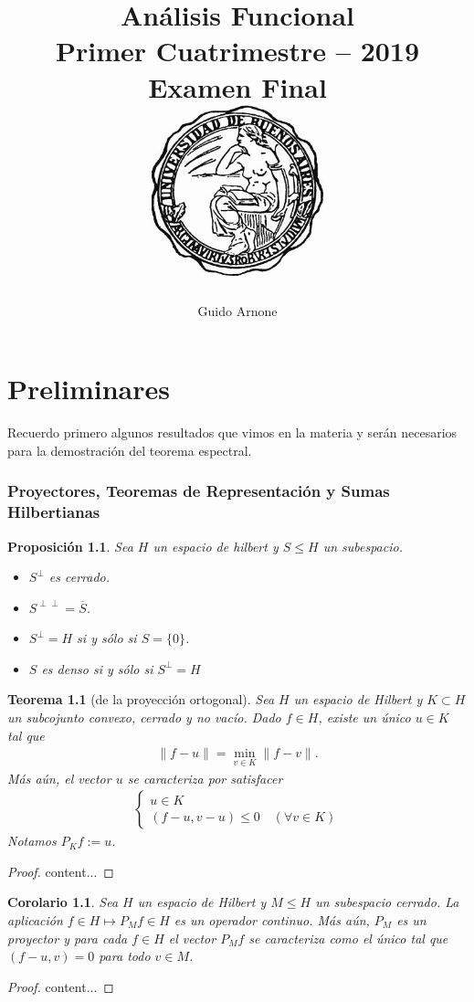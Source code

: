\documentclass[11pt]{report}
\title{
\LARGE{Análisis Funcional}
\\
\vspace{1pt}
\small{Primer Cuatrimestre -- 2019}
\\
\vspace{0.5pt}
\large{Examen Final}
\\
\vspace{80pt}
{\includegraphics[height=5cm]{uba2.jpg}}
\vspace{80pt}
}
\author{Guido Arnone}
\date{}
\theoremstyle{colored}
\newtheorem{theorem}{Teorema}[section]
\newtheorem{proposition}{Proposición}[section]
\newtheorem{corollary}{Corolario}[section]
\newcommand{\ip}[1]{( #1 )}
\begin{document}
\maketitle
\tableofcontents

\chapter{Preliminares}
Recuerdo primero algunos resultados que vimos en la materia y serán necesarios para la demostración del teorema espectral.
\subsection{Proyectores, Teoremas de Representación y Sumas Hilbertianas}

\begin{proposition} Sea $H$ un espacio de hilbert y $S \leq H$ un subespacio. 
\begin{itemize}
\item[(i)] $S^\perp$ es cerrado.
\item[(i)] $S^{\perp\perp} = \overline{S}$.
\item[(iii)] $S^\perp = H$ si y sólo si $S = \{0\}$.
\item[(iv)] $S$ es denso si y sólo si $S^\perp = H$
\end{itemize}
\end{proposition}

\begin{theorem}[de la proyección ortogonal] Sea $H$ un espacio de Hilbert y $K \subset H$ un subcojunto convexo, cerrado y no vacío. Dado $f \in H$, existe un único $u \in K$ tal que
\begin{align*}
\|f-u\| = \min_{v \in K}\|f-v\|.
\end{align*}
Más aún, el vector $u$ se caracteriza por satisfacer
\begin{align*}
\begin{cases}
u \in K\\
\ip{f-u,v-u} \leq 0 \quad (\forall v \in K)
\end{cases}
\end{align*}
Notamos $P_Kf := u$.
\end{theorem}
\begin{proof}
content...
\end{proof}

\begin{corollary} Sea $H$ un espacio de Hilbert y $M \leq H$ un subespacio cerrado. La aplicación $f \in H \mapsto P_Mf \in H$ es un operador continuo. Más aún, $P_M$ es un proyector y para cada $f \in H$ el vector $P_Mf$ se caracteriza como el único tal que $\ip{f-u,v} = 0$ para todo $v \in M$.
\end{corollary}
\begin{proof}
content...
\end{proof}
\end{document}
